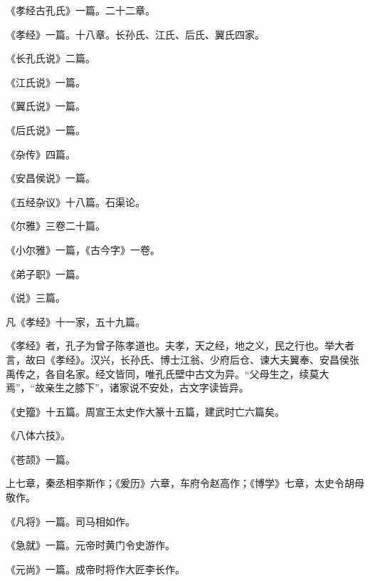 \documentclass[12pt,UTF8]{ctexbook}
\begin{document}
《孝经古孔氏》一篇。二十二章。



《孝经》一篇。十八章。长孙氏、江氏、后氏、翼氏四家。



《长孔氏说》二篇。



《江氏说》一篇。



《翼氏说》一篇。



《后氏说》一篇。



《杂传》四篇。



《安昌侯说》一篇。



《五经杂议》十八篇。石渠论。



《尔雅》三卷二十篇。



《小尔雅》一篇，《古今字》一卷。



《弟子职》一篇。



《说》三篇。



凡《孝经》十一家，五十九篇。



《孝经》者，孔子为曾子陈孝道也。夫孝，天之经，地之义，民之行也。举大者言，故曰《孝经》。汉兴，长孙氏、博士江翁、少府后仓、谏大夫翼奉、安昌侯张禹传之，各自名家。经文皆同，唯孔氏壁中古文为异。“父母生之，续莫大焉”，“故亲生之膝下”，诸家说不安处，古文字读皆异。



《史籀》十五篇。周宣王太史作大篆十五篇，建武时亡六篇矣。



《八体六技》。



《苍颉》一篇。



上七章，秦丞相李斯作；《爰历》六章，车府令赵高作；《博学》七章，太史令胡母敬作。



《凡将》一篇。司马相如作。



《急就》一篇。元帝时黄门令史游作。



《元尚》一篇。成帝时将作大匠李长作。
\end{document}
